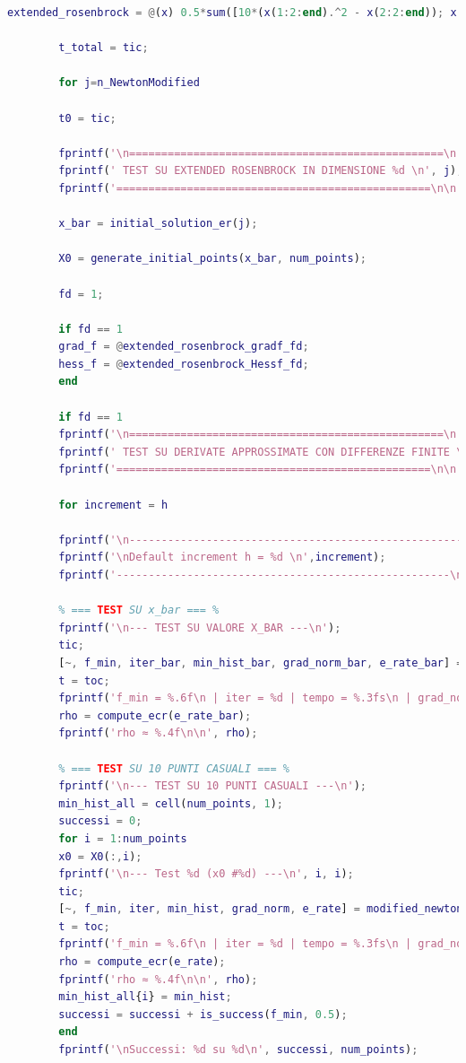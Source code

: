 \documentclass[a4paper,12pt]{article}
\begin{document}
\begin{lstlisting}[language=Matlab,caption={Full script: Modified Newton method on Extended Rosenbrock},label={lst:rosenbrock-extended}]
		extended_rosenbrock = @(x) 0.5*sum([10*(x(1:2:end).^2 - x(2:2:end)); x(1:2:end-1)-1].^2);
		
		t_total = tic;
		
		for j=n_NewtonModified
		
		t0 = tic;
		
		fprintf('\n=================================================\n');
		fprintf(' TEST SU EXTENDED ROSENBROCK IN DIMENSIONE %d \n', j);
		fprintf('=================================================\n\n');
		
		x_bar = initial_solution_er(j);
		
		X0 = generate_initial_points(x_bar, num_points);
		
		fd = 1;
		
		if fd == 1
		grad_f = @extended_rosenbrock_gradf_fd;
		hess_f = @extended_rosenbrock_Hessf_fd;
		end
		
		if fd == 1
		fprintf('\n=================================================\n');
		fprintf(' TEST SU DERIVATE APPROSSIMATE CON DIFFERENZE FINITE \n');
		fprintf('=================================================\n\n');
		
		for increment = h
		
		fprintf('\n----------------------------------------------------');
		fprintf('\nDefault increment h = %d \n',increment);
		fprintf('----------------------------------------------------\n');
		
		% === TEST SU x_bar === %
		fprintf('\n--- TEST SU VALORE X_BAR ---\n');
		tic;
		[~, f_min, iter_bar, min_hist_bar, grad_norm_bar, e_rate_bar] = modified_newton(extended_rosenbrock,grad_f,hess_f,x_bar,tol,max_iter,fd,increment,0);
		t = toc;
		fprintf('f_min = %.6f\n | iter = %d | tempo = %.3fs\n | grad_norm = %.6f\n', f_min, iter_bar, t, grad_norm_bar);
		rho = compute_ecr(e_rate_bar); 
		fprintf('rho ≈ %.4f\n\n', rho);
		
		% === TEST SU 10 PUNTI CASUALI === %
		fprintf('\n--- TEST SU 10 PUNTI CASUALI ---\n');
		min_hist_all = cell(num_points, 1);
		successi = 0;
		for i = 1:num_points
		x0 = X0(:,i);
		fprintf('\n--- Test %d (x0 #%d) ---\n', i, i);
		tic;
		[~, f_min, iter, min_hist, grad_norm, e_rate] = modified_newton(extended_rosenbrock,grad_f,hess_f,x0,tol,max_iter,fd,increment,0);
		t = toc;
		fprintf('f_min = %.6f\n | iter = %d | tempo = %.3fs\n | grad_norm = %.6f\n', f_min, iter, t, grad_norm);
		rho = compute_ecr(e_rate); 
		fprintf('rho ≈ %.4f\n\n', rho);
		min_hist_all{i} = min_hist;
		successi = successi + is_success(f_min, 0.5);
		end
		fprintf('\nSuccessi: %d su %d\n', successi, num_points);
		

\end{lstlisting}
\end{document}
